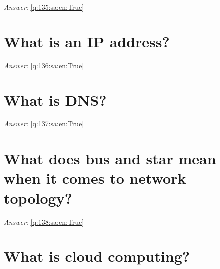 \documentclass[a4paper,11pt,oneside]{book}
\begin{document}
\begin{sloppypar}
\label{q:135:sa:en:False}

\vspace{2cm}

\noindent\makebox[\textwidth]{\hrulefill}

\vspace{1cm}

\textit{Answer}: \autoref{q:135:sa:en:True}



\section{What is an IP address?}

\label{q:136:sa:en:False}

\vspace{2cm}

\noindent\makebox[\textwidth]{\hrulefill}

\vspace{1cm}

\textit{Answer}: \autoref{q:136:sa:en:True}



\section{What is DNS?}

\label{q:137:sa:en:False}

\vspace{2cm}

\noindent\makebox[\textwidth]{\hrulefill}

\vspace{1cm}

\textit{Answer}: \autoref{q:137:sa:en:True}



\section{What does bus and star mean when it comes to network topology?}

\label{q:138:sa:en:False}

\vspace{2cm}

\noindent\makebox[\textwidth]{\hrulefill}

\vspace{1cm}

\textit{Answer}: \autoref{q:138:sa:en:True}



\section{What is cloud computing?}


\end{sloppypar}
\end{document}
